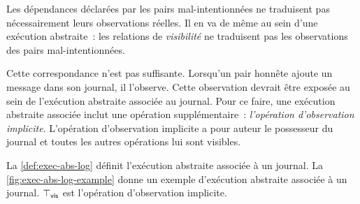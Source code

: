 Les dépendances déclarées par les pairs mal-intentionnées ne traduisent pas nécessairement leurs observations réelles.
Il en va de même au sein d'une exécution abstraite~: les relations de \emph{visibilité} ne traduisent pas les observations des pairs mal-intentionnées.

Cette correspondance n'est pas suffisante.
Lorsqu'un pair honnête ajoute un message dans son journal, il l'observe.
Cette observation devrait être exposée au sein de l'exécution abstraite associée au journal.
Pour ce faire, une exécution abstraite associée inclut une opération supplémentaire~: \emph{l'opération d'observation implicite}.
L'opération d'observation implicite a pour auteur le possesseur du journal et toutes les autres opérations lui sont visibles.

La \autoref{def:exec-abs-log} définit l'exécution abstraite associée à un journal.
La \autoref{fig:exec-abs-log-example} donne un exemple d'exécution abstraite associée à un journal.
$\top_{\operatorname{\mathsf{vis}}}$ est l'opération d'observation implicite.

